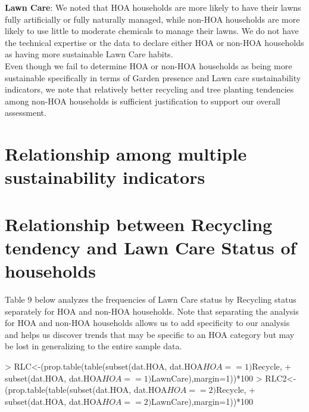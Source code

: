 \documentclass{article}
\begin{document}
\textbf{Lawn Care}: We noted that HOA households are more likely to have their lawns fully artificially or fully naturally managed, while non-HOA households are more likely to use little to moderate chemicals to manage their lawns. We do not have the technical expertise or the data to declare either HOA or non-HOA households as having more sustainable Lawn Care habits.\\

Even though we fail to determine HOA or non-HOA households as being more sustainable specifically in terms of Garden presence and Lawn care sustainability indicators, we note that relatively better recycling and tree planting tendencies among non-HOA households is sufficient justification to support our overall assessment.\\

\section*{Relationship among multiple sustainability indicators}

\section*{Relationship between Recycling tendency and Lawn Care Status of households}

Table 9 below analyzes the frequencies of Lawn Care status by Recycling status separately for HOA and non-HOA households. Note that separating the analysis for HOA and non-HOA households allows us to add specificity to our analysis and helps us discover trends that may be specific to an HOA category but may be lost in generalizing to the entire sample data.

\begin{Schunk}
\begin{Sinput}
> RLC<-(prop.table(table(subset(dat.HOA, dat.HOA$HOA==1)$Recycle,
+                         subset(dat.HOA, dat.HOA$HOA==1)$LawnCare),margin=1))*100
> RLC2<-(prop.table(table(subset(dat.HOA, dat.HOA$HOA==2)$Recycle,
+                         subset(dat.HOA, dat.HOA$HOA==2)$LawnCare),margin=1))*100
\end{Sinput}
\end{Schunk}
\end{document}
